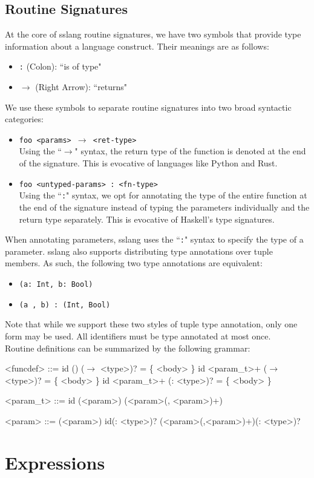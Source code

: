 \documentclass{article}
\begin{document}
\subsection{Routine Signatures}
\noindent At the core of sslang routine signatures, we have two symbols that provide type information about a language construct. Their meanings are as follows:
\begin{itemize}
    \item \texttt{:} (Colon): ``is of type"
    \item \texttt{$\rightarrow$} (Right Arrow): ``returns"
\end{itemize}

\noindent We use these symbols to separate routine signatures into two broad syntactic categories:
\begin{itemize}
    \item \texttt{foo <params> $\rightarrow$ <ret-type>}\\
          Using the ``\texttt{$\rightarrow$}" syntax, the return type of the function is denoted at the end of the signature. This is evocative of languages like Python and Rust.
    \item \texttt{foo <untyped-params> : <fn-type>}\\
          Using the ``\texttt{:}" syntax, we opt for annotating the type of the entire function at the end of the signature instead of typing the parameters individually and the return type separately. This is evocative of Haskell's type signatures.
\end{itemize}

\noindent When annotating parameters, sslang uses the ``\texttt{:}" syntax to specify the type of a parameter. sslang also supports distributing type annotations over tuple members. As such, the following two type annotations are equivalent:
\begin{itemize}
    \item \texttt{(a: Int, b: Bool)}
    \item \texttt{(a , b) : (Int, Bool)}
\end{itemize}

\noindent Note that while we support these two styles of tuple type annotation, only one form may be used. All identifiers must be type annotated at most once. \\

\noindent Routine definitions can be summarized by the following grammar:
\setlength{\grammarindent}{5em}
\begin{grammar}
<funcdef> ::= id () ($\rightarrow$ <type>)? = \{ <body> \}
\alt id <param_t>+ ($\rightarrow$ <type>)? = \{ <body> \}
\alt id <param_t>+ (: <type>)? = \{ <body> \}

<param_t> ::= id
\alt (<param>)
\alt (<param>(, <param>)+)

<param> ::= (<param>)
\alt id(: <type>)?
\alt (<param>(,<param>)+)(: <type>)?
\end{grammar}

\section{Expressions}
\end{document}
